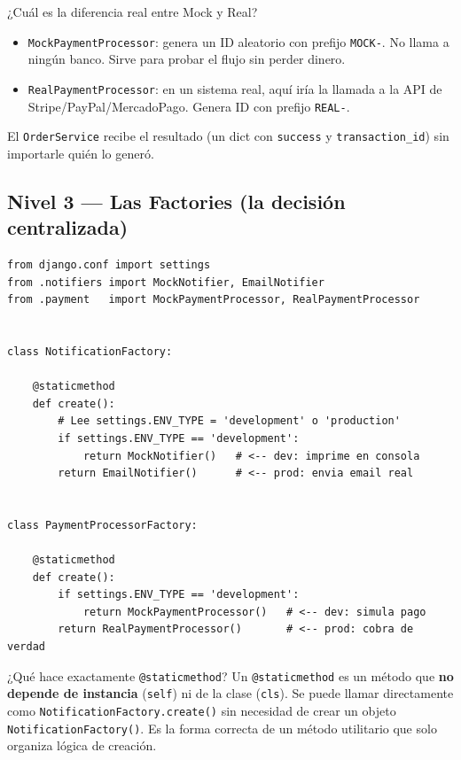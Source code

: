 \documentclass[12pt, a4paper]{article}
\begin{document}
\begin{tipbox}{¿Cuál es la diferencia real entre Mock y Real?}
\begin{itemize}[noitemsep]
  \item \texttt{MockPaymentProcessor}: genera un ID aleatorio con prefijo \texttt{MOCK-}. No llama a ningún banco. Sirve para probar el flujo sin perder dinero.
  \item \texttt{RealPaymentProcessor}: en un sistema real, aquí iría la llamada a la API de Stripe/PayPal/MercadoPago. Genera ID con prefijo \texttt{REAL-}.
\end{itemize}
El \texttt{OrderService} recibe el resultado (un dict con \texttt{success} y
\texttt{transaction\_id}) sin importarle quién lo generó.
\end{tipbox}

\subsection{Nivel 3 — Las Factories (la decisión centralizada)}

\begin{lstlisting}[caption={orders/infra/factories.py -- Las dos factories completas}]
from django.conf import settings
from .notifiers import MockNotifier, EmailNotifier
from .payment   import MockPaymentProcessor, RealPaymentProcessor


class NotificationFactory:

    @staticmethod
    def create():
        # Lee settings.ENV_TYPE = 'development' o 'production'
        if settings.ENV_TYPE == 'development':
            return MockNotifier()   # <-- dev: imprime en consola
        return EmailNotifier()      # <-- prod: envia email real


class PaymentProcessorFactory:

    @staticmethod
    def create():
        if settings.ENV_TYPE == 'development':
            return MockPaymentProcessor()   # <-- dev: simula pago
        return RealPaymentProcessor()       # <-- prod: cobra de verdad
\end{lstlisting}

\begin{conceptbox}{¿Qué hace exactamente \texttt{@staticmethod}?}
Un \texttt{@staticmethod} es un método que \textbf{no depende de instancia}
(\texttt{self}) ni de la clase (\texttt{cls}). Se puede llamar directamente como
\texttt{NotificationFactory.create()} sin necesidad de crear un objeto
\texttt{NotificationFactory()}. Es la forma correcta de un método utilitario
que solo organiza lógica de creación.
\end{conceptbox}
\end{document}
